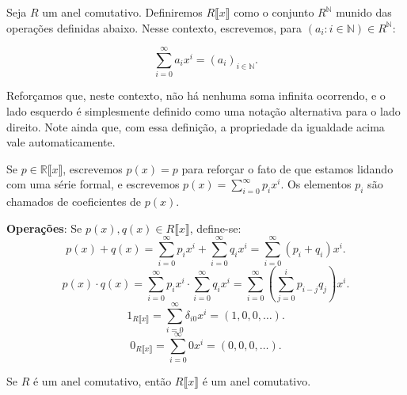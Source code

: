 \begin{definition}
Seja $R$ um anel comutativo.
Definiremos $R\llbracket x\rrbracket$ como o conjunto $R^{\mathbb N}$ munido das operações definidas abaixo.
Nesse contexto, escrevemos, para $(a_i: i \in \mathbb N)\in R^{\mathbb N}$:

\[\sum_{i=0}^\infty a_ix^i=(a_i)_{i \in \mathbb N}.\]

Reforçamos que, neste contexto, não há nenhuma soma infinita ocorrendo, e o lado esquerdo é simplesmente definido como uma notação alternativa para o lado direito.
Note ainda que, com essa definição, a propriedade da igualdade acima vale automaticamente.

Se $p\in \mathbb R\llbracket x\rrbracket$, escrevemos $p(x)=p$ para reforçar o fato de que estamos lidando com uma série formal, e escrevemos $p(x)=\sum_{i=0}^\infty p_ix^i$. Os elementos $p_i$ são chamados de coeficientes de $p(x)$.

\textbf{Operações}:
Se $p(x), q(x) \in R\llbracket x\rrbracket$, define-se:
\[p(x)+q(x)=\sum_{i=0}^\infty p_ix^i+\sum_{i=0}^\infty q_ix^i=\sum_{i=0}^\infty(p_i+q_i)x^i.\]
\[p(x)\cdot q(x)=\sum_{i=0}^\infty p_ix^i\cdot\sum_{i=0}^\infty q_ix^i=\sum_{i=0}^\infty\left(\sum_{j=0}^i p_{i-j}q_{j}\right)x^i.\]
\[1_{R\llbracket x\rrbracket}=\sum_{i=0}^\infty \delta_{i0}x^i=(1, 0, 0, \dots).\]
\[0_{R\llbracket x\rrbracket}=\sum_{i=0}^\infty 0x^i=(0, 0, 0, \dots).\]
\end{definition}

\begin{lemma}
    Se $R$ é um anel comutativo, então $R\llbracket x \rrbracket$ é um anel comutativo.
\end{lemma}

